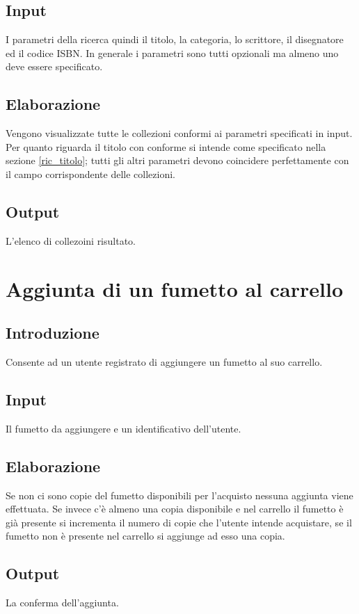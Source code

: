 \documentclass{scrreprt}
\begin{document}
\subsection*{Input}
I parametri della ricerca quindi il titolo, la categoria, lo scrittore, il disegnatore ed il codice ISBN.
In generale i parametri sono tutti opzionali ma almeno uno deve essere specificato.
\subsection*{Elaborazione}
Vengono visualizzate tutte le collezioni conformi ai parametri specificati in input. Per quanto riguarda
il titolo con conforme si intende come specificato nella sezione \ref*{ric_titolo}; tutti gli altri parametri
devono coincidere perfettamente con il campo corrispondente delle collezioni.
\subsection*{Output}
L'elenco di collezoini risultato.

\section{Aggiunta di un fumetto al carrello}

\subsection*{Introduzione}
Consente ad un utente registrato di aggiungere un fumetto al suo carrello.
\subsection*{Input}
Il fumetto da aggiungere e un identificativo dell'utente.
\subsection*{Elaborazione}
Se non ci sono copie del fumetto disponibili per l'acquisto nessuna aggiunta viene effettuata.
Se invece c'è almeno una copia disponibile e nel carrello il fumetto è già presente si incrementa
il numero di copie che l'utente intende acquistare, se il fumetto non è presente nel carrello si
aggiunge ad esso una copia.
\subsection*{Output}
La conferma dell'aggiunta.
\end{document}
